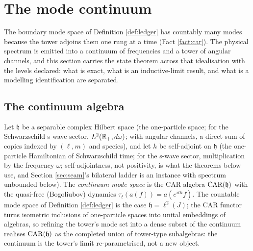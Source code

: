 \section{The mode continuum}\label{sec:continuum}

The boundary mode space of Definition \ref{def:ledger} has countably many modes because the tower adjoins them one rung at a time (Fact \ref{fact:car}). The physical spectrum is emitted into a continuum of frequencies and a tower of angular channels, and this section carries the state theorem across that idealisation with the levels declared: what is exact, what is an inductive-limit result, and what is a modelling identification are separated.

\subsection{The continuum algebra}\label{subsec:contalg}

\begin{definition}\label{def:continuum}
Let $\mathfrak{h}$ be a separable complex Hilbert space (the one-particle space; for the Schwarzschild s-wave sector, $L^2(\mathbb{R}_+, d\omega)$; with angular channels, a direct sum of copies indexed by $(\ell, m)$ and species), and let $h$ be self-adjoint on $\mathfrak{h}$ (the one-particle Hamiltonian of Schwarzschild time; for the s-wave sector, multiplication by the frequency $\omega$; self-adjointness, not positivity, is what the theorems below use, and Section \ref{sec:seam}'s bilateral ladder is an instance with spectrum unbounded below). The \emph{continuum mode space} is the CAR algebra $\mathrm{CAR}(\mathfrak{h})$ with the quasi-free (Bogoliubov) dynamics $\tau_t(a(f)) = a(e^{ith}f)$. The countable mode space of Definition \ref{def:ledger} is the case $\mathfrak{h} = \ell^2(J)$; the CAR functor turns isometric inclusions of one-particle spaces into unital embeddings of algebras, so refining the tower's mode set into a dense subset of the continuum realises $\mathrm{CAR}(\mathfrak{h})$ as the completed union of tower-type subalgebras: the continuum is the tower's limit re-parametrised, not a new object.
\end{definition}

